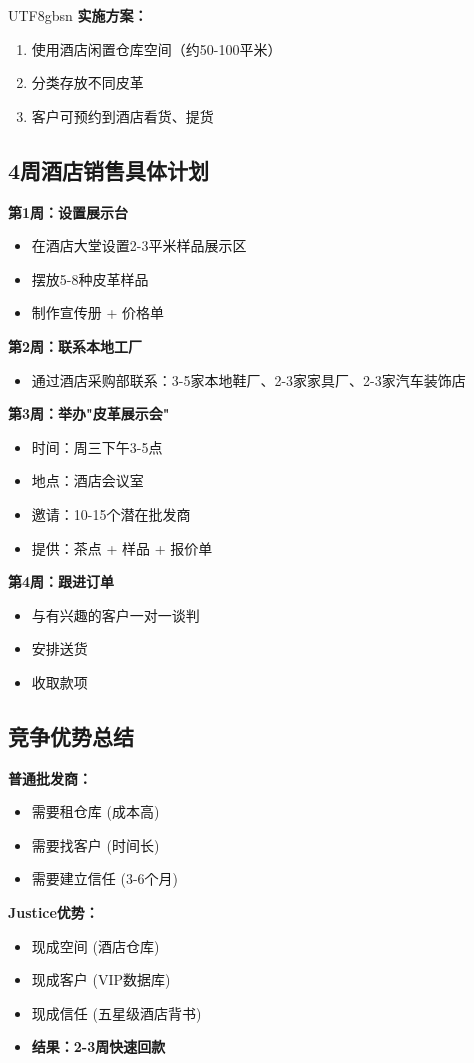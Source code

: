 \documentclass[12pt,a4paper]{article}
\begin{document}
\begin{CJK}{UTF8}{gbsn}
\textbf{实施方案：}
\begin{enumerate}
    \item 使用酒店闲置仓库空间（约50-100平米）
    \item 分类存放不同皮革
    \item 客户可预约到酒店看货、提货
\end{enumerate}

\subsection{4周酒店销售具体计划}

\textbf{第1周：设置展示台}
\begin{itemize}
    \item 在酒店大堂设置2-3平米样品展示区
    \item 摆放5-8种皮革样品
    \item 制作宣传册 + 价格单
\end{itemize}

\textbf{第2周：联系本地工厂}
\begin{itemize}
    \item 通过酒店采购部联系：3-5家本地鞋厂、2-3家家具厂、2-3家汽车装饰店
\end{itemize}

\textbf{第3周：举办"皮革展示会"}
\begin{itemize}
    \item 时间：周三下午3-5点
    \item 地点：酒店会议室
    \item 邀请：10-15个潜在批发商
    \item 提供：茶点 + 样品 + 报价单
\end{itemize}

\textbf{第4周：跟进订单}
\begin{itemize}
    \item 与有兴趣的客户一对一谈判
    \item 安排送货
    \item 收取款项
\end{itemize}

\subsection{竞争优势总结}

\textbf{普通批发商：}
\begin{itemize}
    \item 需要租仓库 (成本高)
    \item 需要找客户 (时间长)
    \item 需要建立信任 (3-6个月)
\end{itemize}

\textbf{Justice优势：}
\begin{itemize}
    \item 现成空间 (酒店仓库)
    \item 现成客户 (VIP数据库)
    \item 现成信任 (五星级酒店背书)
    \item \textbf{结果：2-3周快速回款}
\end{itemize}

\end{CJK}
\end{document}

